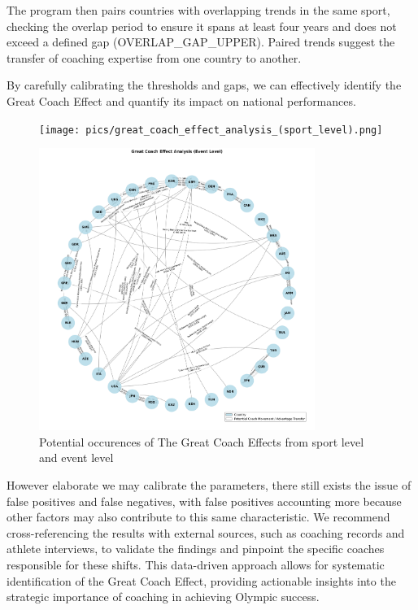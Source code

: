 \documentclass{mcmthesis}
\begin{document}
The program then pairs countries with overlapping trends in the same sport, checking the overlap period to ensure it spans at least four years and does not exceed a defined gap (OVERLAP\_GAP\_UPPER). Paired trends suggest the transfer of coaching expertise from one country to another.

By carefully calibrating the thresholds and gaps, we can effectively identify the Great Coach Effect and quantify its impact on national performances.

\begin{figure}[htbp]
    \begin{minipage}[t]{0.5\textwidth}
        \centering
        \texttt{[image: pics/great\_coach\_effect\_analysis\_(sport\_level).png]}
    \end{minipage}
    \begin{minipage}[t]{0.5\textwidth}
        \centering
        \includegraphics[width=0.8\textwidth]{pics/great_coach_effect_analysis_(event_level).png}
    \end{minipage}
    \caption{Potential occurences of The Great Coach Effects from sport level and event level}
\end{figure}

However elaborate we may calibrate the parameters, there still exists the issue of false positives and false negatives, with false positives accounting more because other factors may also contribute to this same characteristic. We recommend cross-referencing the results with external sources, such as coaching records and athlete interviews, to validate the findings and pinpoint the specific coaches responsible for these shifts. This data-driven approach allows for systematic identification of the Great Coach Effect, providing actionable insights into the strategic importance of coaching in achieving Olympic success.
\end{document}

